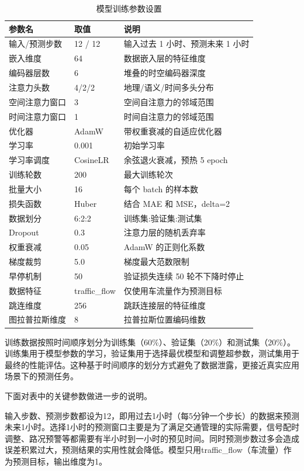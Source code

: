 \begin{table}[htbp]
\centering
\caption{模型训练参数设置}
\label{tab:training-params}
\small
\begin{tabular}{p{3cm}p{1.8cm}p{5.5cm}}
\toprule
\textbf{参数名} & \textbf{取值} & \textbf{说明} \\
\midrule
输入/预测步数 & 12 / 12 & 输入过去 1 小时、预测未来 1 小时 \\
嵌入维度 & 64 & 数据嵌入层的特征维度 \\
编码器层数 & 6 & 堆叠的时空编码器深度 \\
注意力头数 & 4/2/2 & 地理/语义/时间多头分布 \\
空间注意力窗口 & 3 & 空间自注意力的邻域范围 \\
时间注意力窗口 & 1 & 时间自注意力的邻域范围 \\
优化器 & AdamW & 带权重衰减的自适应优化器 \\
学习率 & 0.001 & 初始学习率 \\
学习率调度 & CosineLR & 余弦退火衰减，预热 5 epoch \\
训练轮数 & 200 & 最大训练轮次 \\
批量大小 & 16 & 每个 batch 的样本数 \\
损失函数 & Huber & 结合 MAE 和 MSE，delta=2 \\
数据划分 & 6:2:2 & 训练集:验证集:测试集 \\
Dropout & 0.3 & 注意力层的随机丢弃率 \\
权重衰减 & 0.05 & AdamW 的正则化系数 \\
梯度裁剪 & 5.0 & 梯度最大范数限制 \\
早停机制 & 50 & 验证损失连续 50 轮不下降时停止 \\
数据特征 & traffic\_flow & 仅使用车流量作为预测目标 \\
跳连维度 & 256 & 跳跃连接层的特征维度 \\
图拉普拉斯维度 & 8 & 拉普拉斯位置编码维数 \\
\bottomrule
\end{tabular}
\end{table}

训练数据按照时间顺序划分为训练集（60\%）、验证集（20\%）和测试集（20\%）。训练集用于模型参数的学习，验证集用于选择最优模型和调整超参数，测试集用于最终的性能评估。这种基于时间顺序的划分方式避免了数据泄露，更接近真实应用场景下的预测任务。

下面对表中的关键参数做进一步的说明。

输入步数、预测步数都设为12，即用过去1小时（每5分钟一个步长）的数据来预测未来1小时。选择1小时的预测窗口主要是为了满足交通管理的实际需要，信号配时调整、路况预警等都需要有半小时到一小时的预见时间。同时预测步数过多会造成误差积累过大，预测结果的实用性就会降低。模型只用traffic\_flow（车流量）作为预测目标，输出维度为1。

